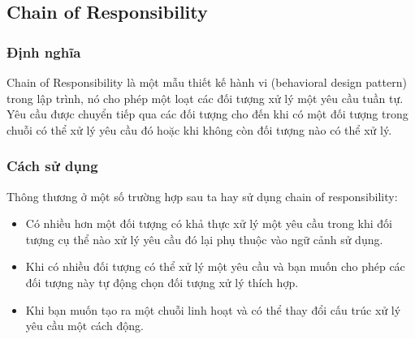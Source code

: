 \subsection{Chain of Responsibility}
\subsubsection{Định nghĩa}
Chain of Responsibility là một mẫu thiết kế hành vi (behavioral design pattern) trong lập trình, nó cho phép một loạt các đối tượng xử lý một yêu cầu tuần tự. Yêu cầu được chuyển tiếp qua các đối tượng cho đến khi có một đối tượng trong chuỗi có thể xử lý yêu cầu đó hoặc khi không còn đối tượng nào có thể xử lý.
\subsubsection{Cách sử dụng}
Thông thương ở một số trường hợp sau ta hay sử dụng chain of responsibility:
\begin{itemize}
    \item Có nhiều hơn một đối tượng có khả thực xử lý một yêu cầu trong khi đối tượng cụ thể nào xử lý yêu cầu đó lại phụ thuộc vào ngữ cảnh sử dụng.
    \item Khi có nhiều đối tượng có thể xử lý một yêu cầu và bạn muốn cho phép các đối tượng này tự động chọn đối tượng xử lý thích hợp.
    \item Khi bạn muốn tạo ra một chuỗi linh hoạt và có thể thay đổi cấu trúc xử lý yêu cầu một cách động.
\end{itemize}
